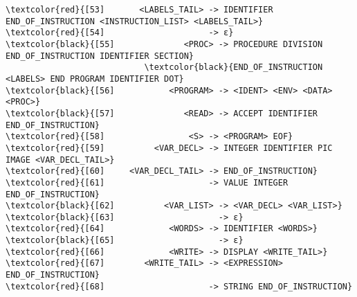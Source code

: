 \begin{Verbatim}[commandchars=\\\{\}]
\textcolor{red}{[53]       <LABELS_TAIL> -> IDENTIFIER END_OF_INSTRUCTION <INSTRUCTION_LIST> <LABELS_TAIL>}
\textcolor{red}{[54]                     -> ε}
\textcolor{black}{[55]              <PROC> -> PROCEDURE DIVISION END_OF_INSTRUCTION IDENTIFIER SECTION}
                            \textcolor{black}{END_OF_INSTRUCTION <LABELS> END PROGRAM IDENTIFIER DOT}
\textcolor{black}{[56]           <PROGRAM> -> <IDENT> <ENV> <DATA> <PROC>}
\textcolor{black}{[57]              <READ> -> ACCEPT IDENTIFIER END_OF_INSTRUCTION}
\textcolor{red}{[58]                 <S> -> <PROGRAM> EOF}
\textcolor{red}{[59]          <VAR_DECL> -> INTEGER IDENTIFIER PIC IMAGE <VAR_DECL_TAIL>}
\textcolor{red}{[60]     <VAR_DECL_TAIL> -> END_OF_INSTRUCTION}
\textcolor{red}{[61]                     -> VALUE INTEGER END_OF_INSTRUCTION}
\textcolor{black}{[62]          <VAR_LIST> -> <VAR_DECL> <VAR_LIST>}
\textcolor{black}{[63]                     -> ε}
\textcolor{red}{[64]             <WORDS> -> IDENTIFIER <WORDS>}
\textcolor{black}{[65]                     -> ε}
\textcolor{red}{[66]             <WRITE> -> DISPLAY <WRITE_TAIL>}
\textcolor{red}{[67]        <WRITE_TAIL> -> <EXPRESSION> END_OF_INSTRUCTION}
\textcolor{red}{[68]                     -> STRING END_OF_INSTRUCTION}
\end{Verbatim}
\endgroup